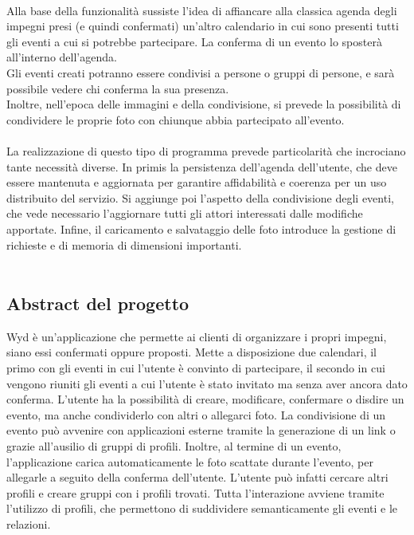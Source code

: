 \\
Alla base della funzionalità sussiste l'idea di affiancare alla classica agenda degli impegni presi (e quindi confermati) 
un'altro calendario in cui sono presenti tutti gli eventi a cui si potrebbe partecipare. 
La conferma di un evento lo sposterà all'interno dell'agenda.\\
Gli eventi creati potranno essere condivisi a persone o gruppi di persone, e sarà possibile vedere chi conferma la sua presenza.\\
Inoltre, nell'epoca delle immagini e della condivisione, si prevede la possibilità di condividere le proprie foto con chiunque abbia partecipato all'evento.\\
\\
La realizzazione di questo tipo di programma prevede particolarità che incrociano tante necessità diverse.
In primis la persistenza dell'agenda dell'utente, che deve essere mantenuta e aggiornata per garantire affidabilità e coerenza per un uso distribuito del servizio.
Si aggiunge poi l'aspetto della condivisione degli eventi, che vede necessario l'aggiornare tutti gli attori interessati dalle modifiche apportate.
Infine, il caricamento e salvataggio delle foto introduce la gestione di richieste e di memoria di dimensioni importanti.\\
\\
\clearpage

\subsection{Abstract del progetto}

Wyd è un'applicazione che permette ai clienti di organizzare i propri impegni, siano essi confermati oppure proposti.\newline
Mette a disposizione due calendari, il primo con gli eventi in cui l'utente è convinto di partecipare, 
il secondo in cui vengono riuniti gli eventi a cui l'utente è stato invitato ma senza aver ancora dato conferma.\newline
L'utente ha la possibilità di creare, modificare, confermare o disdire un evento, ma anche condividerlo con altri o allegarci foto.
La condivisione di un evento può avvenire con applicazioni esterne tramite la generazione di un link o grazie all'ausilio di gruppi di profili.
Inoltre, al termine di un evento, l'applicazione carica automaticamente le foto scattate durante l'evento, per allegarle a seguito della conferma dell'utente.\newline  
L'utente può infatti cercare altri profili e creare gruppi con i profili trovati.\newline
Tutta l'interazione avviene tramite l'utilizzo di profili, che permettono di suddividere semanticamente gli eventi e le relazioni.\newline

